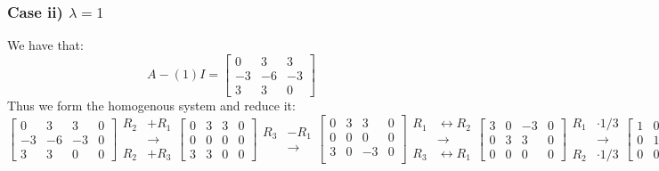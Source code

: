 \documentclass{article}
\begin{document}
\subsubsection*{Case ii) $\lambda = 1$}
We have that: $$A-(1)I=\begin{bmatrix}
0&3&3\\
-3&-6&-3\\
3&3&0
\end{bmatrix}$$
Thus we form the homogenous system and reduce it: $$
\left[\begin{array}{ccc|c}
        0&3&3 & 0\\
    -3&-6&-3 & 0\\
    3&3&0 & 0
    \end{array}\right]\begin{aligned}
        R_{2}&+R_{1}\\
        &\rightarrow\\
        R_{2}&+R_{3}
    \end{aligned}\left[\begin{array}{ccc|c}
        0 & 3 & 3 & 0\\
    0 & 0 & 0 & 0\\
    3 & 3& 0 & 0
    \end{array}\right]\begin{aligned}
        R_{3}&-R_{1}\\
        &\rightarrow
    \end{aligned}\left[\begin{array}{ccc|c}
        0 & 3 & 3 & 0\\
    0 & 0 & 0 & 0\\
    3 & 0 & -3 & 0\\
    \end{array}\right]\begin{aligned}
        R_{1} &\leftrightarrow R_{2}\\
        &\rightarrow\\
        R_{3} &\leftrightarrow R_{1}
    \end{aligned}\left[\begin{array}{ccc|c}
    3 & 0 & -3 & 0\\
    0 & 3 & 3 & 0\\
    0 & 0 & 0 & 0
    \end{array}\right]\begin{aligned}
        R_{1}& \cdot 1/3\\
        & \rightarrow\\
        R_{2} &\cdot 1/3
    \end{aligned}\left[\begin{array}{ccc|c}
    1 & 0 & -1 & 0\\
    0 & 1 & 1 & 0\\
    0 & 0 & 0 & 0
    \end{array}\right]$$
\end{document}
